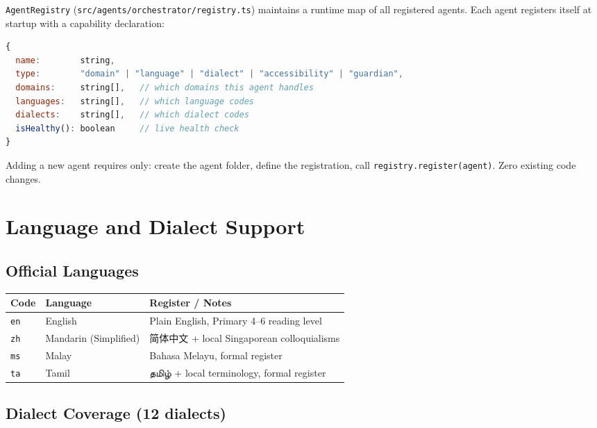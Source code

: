 \documentclass[12pt,a4paper]{article}
\begin{document}
\texttt{AgentRegistry} (\texttt{src/agents/orchestrator/registry.ts}) maintains
a runtime map of all registered agents. Each agent registers itself at startup
with a capability declaration:

\begin{lstlisting}[language=JavaScript]
{
  name:        string,
  type:        "domain" | "language" | "dialect" | "accessibility" | "guardian",
  domains:     string[],   // which domains this agent handles
  languages:   string[],   // which language codes
  dialects:    string[],   // which dialect codes
  isHealthy(): boolean     // live health check
}
\end{lstlisting}

Adding a new agent requires only: create the agent folder, define the
registration, call \texttt{registry.register(agent)}. Zero existing code changes.

\section{Language and Dialect Support}
\label{sec:languages}

\subsection{Official Languages}

\begin{tabular}{@{}lll@{}}
\toprule
\textbf{Code} & \textbf{Language} & \textbf{Register / Notes} \\
\midrule
\texttt{en} & English & Plain English, Primary 4–6 reading level \\
\texttt{zh} & Mandarin (Simplified) & 简体中文 + local Singaporean colloquialisms \\
\texttt{ms} & Malay & Bahasa Melayu, formal register \\
\texttt{ta} & Tamil & தமிழ் + local terminology, formal register \\
\bottomrule
\end{tabular}

\subsection{Dialect Coverage (12 dialects)}
\end{document}
